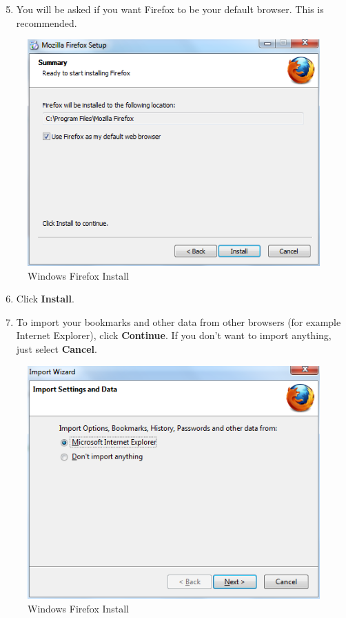 \begin{enumerate}[1.]
\setcounter{enumi}{4}
\item
  You will be asked if you want Firefox to be your default browser. This
  is recommended.
\end{enumerate}
\begin{figure}[htbp]
\centering
\includegraphics{ff_win_inst_3.png}
\caption{Windows Firefox Install}
\end{figure}

\begin{enumerate}[1.]
\setcounter{enumi}{5}
\item
  Click \textbf{Install}.
\item
  To import your bookmarks and other data from other browsers (for
  example Internet Explorer), click \textbf{Continue}. If you don't want
  to import anything, just select \textbf{Cancel}.
\end{enumerate}
\begin{figure}[htbp]
\centering
\includegraphics{ff_win_inst_4.png}
\caption{Windows Firefox Install}
\end{figure}


